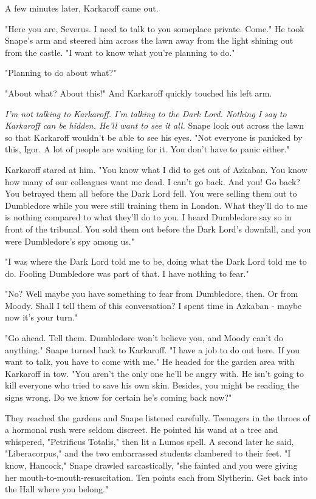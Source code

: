 \documentclass[a4paper,11pt]{article}
\begin{document}
A few minutes later, Karkaroff came out.

"Here you are, Severus. I need to talk to you someplace private. Come." He took Snape's arm and steered him across the lawn away from the light shining out from the castle. "I want to know what you're planning to do."

"Planning to do about what?"

"About what? About this!" And Karkaroff quickly touched his left arm.

\emph{I'm not talking to Karkaroff. I'm talking to the Dark Lord. Nothing I say to Karkaroff can be hidden. He'll want to see it all.} Snape look out across the lawn so that Karkaroff wouldn't be able to see his eyes. "Not everyone is panicked by this, Igor. A lot of people are waiting for it. You don't have to panic either."

Karkaroff stared at him. "You know what I did to get out of Azkaban. You know how many of our colleagues want me dead. I can't go back. And you! Go back? You betrayed them all before the Dark Lord fell. You were selling them out to Dumbledore while you were still training them in London. What they'll do to me is nothing compared to what they'll do to you. I heard Dumbledore say so in front of the tribunal. You sold them out before the Dark Lord's downfall, and you were Dumbledore's spy among us."

"I was where the Dark Lord told me to be, doing what the Dark Lord told me to do. Fooling Dumbledore was part of that. I have nothing to fear."

"No? Well maybe you have something to fear from Dumbledore, then. Or from Moody. Shall I tell them of this conversation? I spent time in Azkaban - maybe now it's your turn."

"Go ahead. Tell them. Dumbledore won't believe you, and Moody can't do anything." Snape turned back to Karkaroff. "I have a job to do out here. If you want to talk, you have to come with me." He headed for the garden area with Karkaroff in tow. "You aren't the only one he'll be angry with. He isn't going to kill everyone who tried to save his own skin. Besides, you might be reading the signs wrong. Do we know for certain he's coming back now?"

They reached the gardens and Snape listened carefully. Teenagers in the throes of a hormonal rush were seldom discreet. He pointed his wand at a tree and whispered, "Petrificus Totalis," then lit a Lumos spell. A second later he said, "Liberacorpus," and the two embarrassed students clambered to their feet. "I know, Hancock," Snape drawled sarcastically, "she fainted and you were giving her mouth-to-mouth-resuscitation. Ten points each from Slytherin. Get back into the Hall where you belong."
\end{document}
